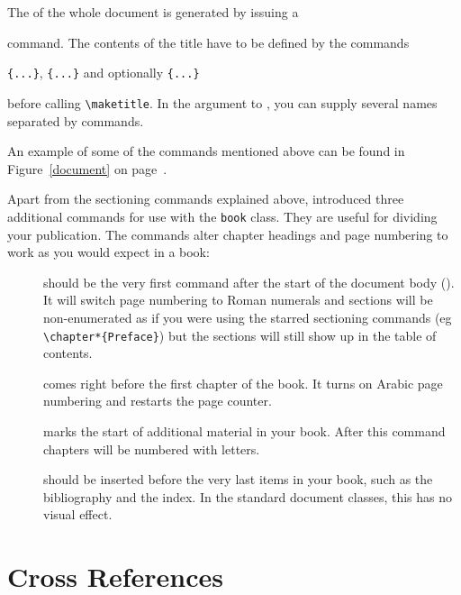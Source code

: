 The  of the whole document is generated by issuing a
\begin{lscommand}
\end{lscommand}
\noindent command. The contents of the title have to be defined by the commands
\begin{lscommand}
\verb|{...}|, \verb|{...}|
and optionally \verb|{...}|
\end{lscommand}
\noindent before calling \verb|\maketitle|. In the argument to , you can supply several names separated by  commands.

An example of some of the commands mentioned above can be found in
Figure~\ref{document} on page~\pageref{document}.

Apart from the sectioning commands explained above, \LaTeXe{}
introduced three additional commands for use with the \verb|book| class.
They are useful for dividing your publication. The commands alter
chapter headings and page numbering to work as you would expect in
a book:
\begin{description}
\item[] should be the very first command after
  the start of the document body (\verb||). It will switch page numbering to Roman
    numerals and sections will be non-enumerated as if you were using
    the starred sectioning commands (eg \verb|\chapter*{Preface}|)
    but the sections will still show up in the table of contents.
\item[] comes right before the first chapter of
  the book. It turns on Arabic page numbering and restarts the page
  counter.
\item[] marks the start of additional material in your
  book. After this command chapters will be numbered with letters.
\item[] should be inserted before the very last items
  in your book, such as the bibliography and the index. In the standard
  document classes, this has no visual effect.
\end{description}


\section{Cross References}

